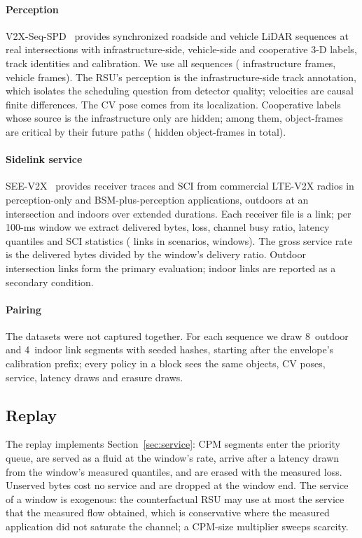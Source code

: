 \documentclass[journal]{IEEEtran}
\theoremstyle{remark}
\begin{document}
\paragraph*{Perception} V2X-Seq-SPD~\cite{v2xseq} provides synchronized roadside and vehicle LiDAR sequences at real intersections with infrastructure-side, vehicle-side and cooperative 3-D labels, track identities and calibration. We use all \resDataSequences{} sequences (\resDataInfrastructureFrames{} infrastructure frames, \resDataVehicleFrames{} vehicle frames). The RSU's perception is the infrastructure-side track annotation, which isolates the scheduling question from detector quality; velocities are causal finite differences. The CV pose comes from its localization. Cooperative labels whose source is the infrastructure only are hidden; among them, \resDataGtCritical{} object-frames are critical by their future paths (\resDataGtHidden{} hidden object-frames in total).
\paragraph*{Sidelink service} SEE-V2X~\cite{seev2x} provides receiver traces and SCI from commercial LTE-V2X radios in perception-only and BSM-plus-perception applications, outdoors at an intersection and indoors over extended durations. Each receiver file is a link; per 100-ms window we extract delivered bytes, loss, channel busy ratio, latency quantiles and SCI statistics (\resDataLinks{} links in \resDataScenarios{} scenarios, \resDataWindows{} windows). The gross service rate is the delivered bytes divided by the window's delivery ratio. Outdoor intersection links form the primary evaluation; indoor links are reported as a secondary condition.
\paragraph*{Pairing} The datasets were not captured together. For each sequence we draw 8~outdoor and 4~indoor link segments with seeded hashes, starting after the envelope's calibration prefix; every policy in a block sees the same objects, CV poses, service, latency draws and erasure draws.

\subsection{Replay}
The replay implements Section~\ref{sec:service}: CPM segments enter the priority queue, are served as a fluid at the window's rate, arrive after a latency drawn from the window's measured quantiles, and are erased with the measured loss. Unserved bytes cost no service and are dropped at the window end. The service of a window is exogenous: the counterfactual RSU may use at most the service that the measured flow obtained, which is conservative where the measured application did not saturate the channel; a CPM-size multiplier sweeps scarcity.
\end{document}
